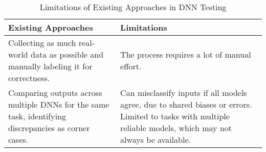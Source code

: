 	
\begin{table}[h]
    \centering
    \begin{tabular}{|p{6cm}|p{6cm}|}
    \hline
    \textbf{Existing Approaches} & \textbf{Limitations} \\
    \hline
    Collecting as much real-world data as possible and manually labeling it for correctness. & The process requires a lot of manual effort. \\
    \hline
    Comparing outputs across multiple DNNs for the same task, identifying discrepancies as corner cases. & Can misclassify inputs if all models agree, due to shared biases or errors. Limited to tasks with multiple reliable models, which may not always be available. \\
    \hline
    \end{tabular}
    \caption{Limitations of Existing Approaches in DNN Testing}
    \label{table:existing_approaches_limitations}
    \end{table}

